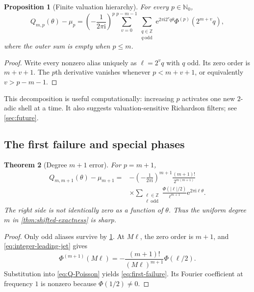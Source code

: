 \documentclass[11pt]{article}
\newtheorem{theorem}{Theorem}[section]
\newtheorem{proposition}[theorem]{Proposition}
\theoremstyle{definition}
\newcommand{\e}{\mathrm{e}}
\newcommand{\ii}{\mathrm{i}}
\newcommand{\Z}{\mathbb{Z}}
\newcommand{\N}{\mathbb{N}}
\begin{document}
\begin{proposition}[Finite valuation hierarchy]
\label{prop:alias-layers}
For every $p\in\N_0$,
\begin{equation}
 Q_{m,p}(\theta)-\mu_p
 =\left(-\frac{1}{2\pi\ii}\right)^p
 \sum_{v=0}^{p-m-1}
 \sum_{\substack{q\in\Z\\q\ \mathrm{odd}}}
 \e^{2\pi\ii 2^vq\theta}
 \Phi^{(p)}(2^{m+v}q),
 \label{eq:alias-layers}
\end{equation}
where the outer sum is empty when $p\le m$.
\end{proposition}

\begin{proof}
Write every nonzero alias uniquely as $\ell=2^vq$ with $q$ odd.  Its zero
order is $m+v+1$.  The $p$th derivative vanishes whenever $p<m+v+1$, or
equivalently $v>p-m-1$.
\end{proof}

This decomposition is useful computationally: increasing $p$ activates one
new $2$-adic shell at a time.  It also suggests valuation-sensitive
Richardson filters; see \cref{sec:future}.

\subsection{The first failure and special phases}

\begin{theorem}[Degree $m+1$ error]
\label{thm:first-failure}
For $p=m+1$,
\begin{equation}
\begin{split}
 Q_{m,m+1}(\theta)-\mu_{m+1}
 ={}&-\left(-\frac{1}{2\pi\ii}\right)^{m+1}
 \frac{(m+1)!}{2^{m(m+1)}}\\
 &\times
 \sum_{\substack{\ell\in\Z\\\ell\ \mathrm{odd}}}
 \frac{\Phi(|\ell|/2)}{\ell^{m+1}}
 \e^{2\pi\ii\ell\theta}.
\end{split}
\label{eq:first-failure}
\end{equation}
The right side is not identically zero as a function of $\theta$.  Thus the
uniform degree $m$ in \cref{thm:shifted-exactness} is sharp.
\end{theorem}

\begin{proof}
Only odd aliases survive by \cref{prop:alias-layers}.  At $M\ell$, the zero
order is $m+1$, and \eqref{eq:integer-leading-jet} gives
\[
 \Phi^{(m+1)}(M\ell)
 =-\frac{(m+1)!}{(M\ell)^{m+1}}\Phi(\ell/2).
\]
Substitution into \eqref{eq:Q-Poisson} yields \eqref{eq:first-failure}.  Its
Fourier coefficient at frequency $1$ is nonzero because $\Phi(1/2)\ne0$.
\end{proof}
\end{document}
